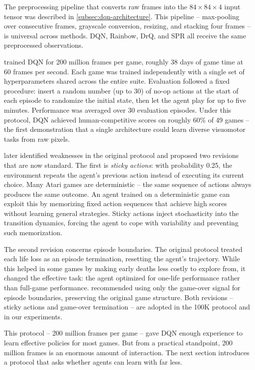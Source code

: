\smallskip
The preprocessing pipeline that converts raw frames into the
$84 \times 84 \times 4$ input tensor was described in
\cref{subsec:dqn-architecture}. This pipeline -- max-pooling over
consecutive frames, grayscale conversion, resizing, and stacking
four frames -- is universal across methods. DQN, Rainbow, DrQ,
and SPR all receive the same preprocessed observations.

\smallskip
\citet{mnih2015human} trained DQN for 200 million frames per game,
roughly 38 days of game time at 60 frames per second. Each game
was trained independently with a single set of hyperparameters
shared across the entire suite. Evaluation followed a fixed
procedure: insert a random number (up to 30) of no-op actions at
the start of each episode to randomize the initial state, then let
the agent play for up to five minutes. Performance was averaged
over 30 evaluation episodes. Under this protocol, DQN achieved
human-competitive scores on roughly 60\% of 49 games -- the first
demonstration that a single architecture could learn diverse
visuomotor tasks from raw pixels.

\smallskip
\citet{machado2018revisiting} later identified weaknesses in the
original protocol and proposed two revisions that are now standard.
The first is \emph{sticky actions}: with probability 0.25, the
environment repeats the agent's previous action instead of
executing its current choice. Many Atari games are deterministic --
the same sequence of actions always produces the same outcome. An
agent trained on a deterministic game can exploit this by
memorizing fixed action sequences that achieve high scores without
learning general strategies. Sticky actions inject stochasticity
into the transition dynamics, forcing the agent to cope with
variability and preventing such memorization.

\smallskip
The second revision concerns episode boundaries. The original
protocol treated each life loss as an episode termination,
resetting the agent's trajectory. While this helped in some games
by making early deaths less costly to explore from, it changed the
effective task: the agent optimized for one-life performance rather
than full-game performance. \citet{machado2018revisiting}
recommended using only the game-over signal for episode boundaries,
preserving the original game structure. Both revisions -- sticky
actions and game-over termination -- are adopted in the 100K
protocol and in our experiments.

\smallskip
This protocol -- 200 million frames per game -- gave DQN enough
experience to learn effective policies for most games. But from a
practical standpoint, 200 million frames is an enormous amount of
interaction. The next section introduces a protocol that asks
whether agents can learn with far less.

